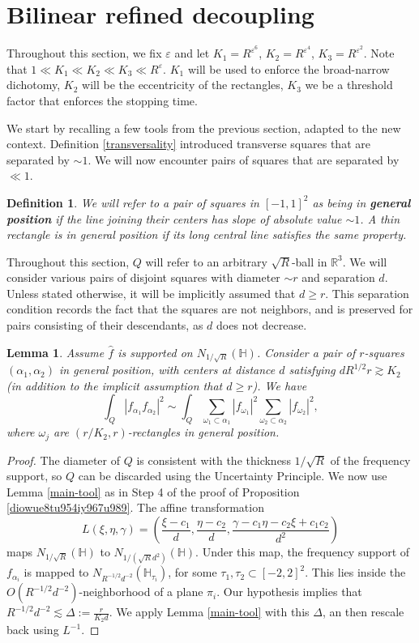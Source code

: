 \documentclass{amsart}%
\numberwithin{equation}{section}
\newtheorem{lemma}[theorem]{Lemma}
\newtheorem{definition}[theorem]{Definition}
\newcommand{\e}{\varepsilon}
\newcommand{\ZH}{\mathbb{H}}
\newcommand{\R}{\mathbb{R}}
\newcommand{\1}{\mathbbm{1}}
\begin{document}
\section{Bilinear refined decoupling}
	
	

    Throughout this section, we fix $\e$ and let $K_1=R^{\e^{6}}$, $K_2=R^{\e^{4}}$, $K_3=R^{\e^{2}}$. Note that $1\ll K_1\ll K_2\ll K_3\ll R^\e$.
	$K_1$ will be used to enforce the broad-narrow dichotomy, $K_2$ will be the eccentricity of the rectangles, $K_3$ we be a threshold factor that enforces the stopping time.
	
	We start by recalling a few tools from the previous section, adapted to the new context. Definition \ref{transversality} introduced transverse squares that are separated by $\sim 1$. We will now encounter pairs of squares that are separated by $\ll 1$. 
    \begin{definition}
    We will refer to a pair of squares in $[-1,1]^2$ as being in {\bf general position} if the line joining their centers has slope of absolute value  $\sim 1$. A thin rectangle is in general position if its long central line satisfies the same property.  
    \end{definition}
    Throughout this section, $Q$ will refer to an arbitrary $\sqrt{R}$-ball in $\R^3$. We will consider various pairs of  disjoint squares with diameter $\sim r$ and separation $d$.
    Unless stated otherwise, it will be implicitly assumed that $d\ge r$. This separation condition records the fact that the squares are not neighbors, and is preserved for pairs consisting of their descendants, as  $d$ does not decrease.
	\begin{lemma}
		\label{main-toolff}
        Assume $\widehat{f}$ is supported on 
        $N_{1/\sqrt{R}}(\ZH)$.
		Consider a pair of $r$-squares $(\alpha_1,\alpha_2)$ in general position, with centers at distance $d$ satisfying $dR^{1/2}r \gtrsim K_2$ (in addition to the implicit assumption that $d\ge r$). We have 		$$\int_Q|f_{\alpha_1}f_{\alpha_2}|^2\sim \int_Q\sum_{\omega_1\subset \alpha_1}|f_{\omega_1}|^2\sum_{\omega_2\subset \alpha_2}|f_{\omega_2}|^2,$$
		where $\omega_j$ are $(r/K_2,r)$-rectangles in general position.
	\end{lemma}
    \begin{proof} The diameter of $Q$ is consistent with the thickness $1/\sqrt{R}$ of the frequency support, so $Q$ can be discarded using the Uncertainty Principle.  We now use Lemma \ref{main-tool} as in Step 4 of the proof of Proposition \ref{diowue8tu954iy967u989}. The affine transformation
		$$L(\xi,\eta, \gamma)= (\frac{\xi-c_1}{d},\frac{\eta-c_2}{d},\frac{\gamma-c_1\eta-c_2\xi+c_1c_2}{d^2})$$
		maps $N_{1/\sqrt{R}}(\ZH)$ to $N_{1/(\sqrt{R}d^2)}(\ZH)$. Under this map, the frequency support of $f_{\alpha_i}$ is mapped to $N_{R^{-1/2}d^{-2}}(\ZH_{\tau_i})$, for some $\tau_1,\tau_2\subset [-2,2]^2$. This lies inside the $O(R^{-1/2}d^{-2})$-neighborhood of a plane $\pi_i$. Our hypothesis implies that $R^{-1/2}d^{-2}\lesssim \Delta:=\frac{r}{K_2d}$. We apply Lemma \ref{main-tool} with this $\Delta$, an then rescale back using $L^{-1}$. \qedhere
    
\end{proof}
\end{document}
